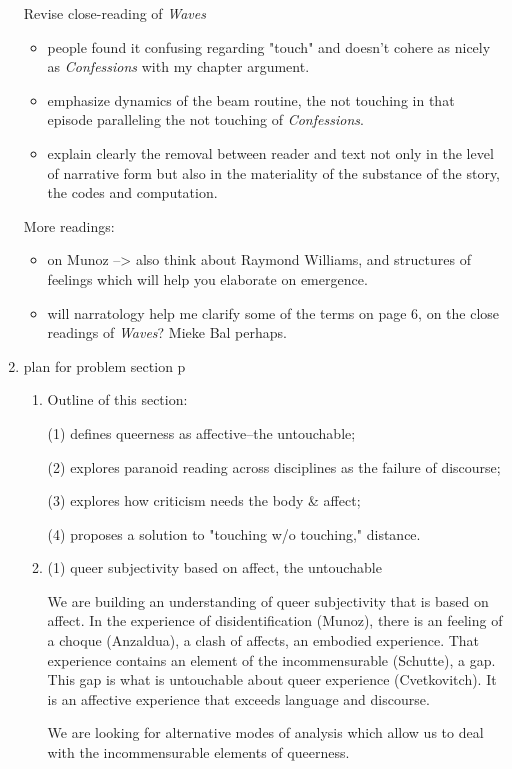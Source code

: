 \documentclass[11pt]{article}
\begin{document}
\begin{enumerate}
Revise close-reading of \emph{Waves}
\begin{itemize}
\item people found it confusing regarding "touch" and doesn't cohere as
nicely as \emph{Confessions} with my chapter argument.
\item emphasize dynamics of the beam routine, the not touching in that
episode paralleling the not touching of \emph{Confessions}.
\item explain clearly the removal between reader and text not only in the
level of narrative form but also in the materiality of the substance
of the story, the codes and computation.
\end{itemize}

More readings:
\begin{itemize}
\item on Munoz --> also think about Raymond Williams, and structures of
feelings which will help you elaborate on emergence.
\item will narratology help me clarify some of the terms on page 6, on the
close readings of \emph{Waves}? Mieke Bal perhaps.
\end{itemize}

\item plan for problem section p
\label{sec:org47aa77e}
\begin{enumerate}
\item Outline of this section:
\label{sec:orgcd8b1e4}

(1) defines queerness as affective--the untouchable; 

(2) explores paranoid reading across disciplines as the failure of
discourse;

(3) explores how criticism needs the body \& affect; 

(4) proposes a solution to "touching w/o touching," distance.

\item (1) queer subjectivity based on affect, the untouchable
\label{sec:org480aa97}

We are building an understanding of queer subjectivity that is based
on affect. In the experience of disidentification (Munoz), there is an
feeling of a choque (Anzaldua), a clash of affects, an embodied
experience. That experience contains an element of the incommensurable
(Schutte), a gap. This gap is what is untouchable about queer
experience (Cvetkovitch). It is an affective experience that exceeds
language and discourse.

We are looking for alternative modes of analysis which allow us to
deal with the incommensurable elements of queerness.


\end{enumerate}
\end{enumerate}
\end{document}
